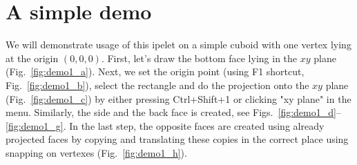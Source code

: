 \documentclass[11pt,a4paper]{article}
\begin{document}

\section{A simple demo}

We will demonstrate usage of this ipelet on a simple cuboid with one vertex lying at the origin $(0,0,0)$. First, let's draw the bottom face lying in the $xy$ plane (Fig.~\ref{fig:demo1_a}). Next, we set the origin point (using F1 shortcut, Fig.~\ref{fig:demo1_b}), select the rectangle and do the projection onto the $ xy $ plane (Fig.~\ref{fig:demo1_c}) by either pressing Ctrl+Shift+1 or clicking "xy plane" in the menu. Similarly, the side and the back face is created, see Figs.~\ref{fig:demo1_d}--\ref{fig:demo1_g}. In the last step, the opposite faces are created using already projected faces by copying and translating these copies in the correct place using snapping on vertexes (Fig.~\ref{fig:demo1_h}).
\end{document}
